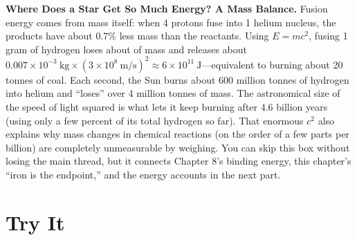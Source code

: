 \begin{tiaozhan}
\textbf{Where Does a Star Get So Much Energy? A Mass Balance.} Fusion energy comes from mass itself: when 4 protons fuse into 1 helium nucleus, the products have about $0.7\%$ less mass than the reactants. Using $E=mc^2$, fusing 1 gram of hydrogen loses about  of mass and releases about $0.007\times 10^{-3}\ \mathrm{kg}\times (3\times 10^{8}\ \mathrm{m/s})^2 \approx 6\times 10^{11}\ \mathrm{J}$---equivalent to burning about 20 tonnes of coal. Each second, the Sun burns about 600 million tonnes of hydrogen into helium and ``loses'' over 4 million tonnes of mass. The astronomical size of the speed of light squared is what lets it keep burning after 4.6 billion years (using only a few percent of its total hydrogen so far). That enormous $c^2$ also explains why mass changes in chemical reactions (on the order of a few parts per billion) are completely unmeasurable by weighing. You can skip this box without losing the main thread, but it connects Chapter 8's binding energy, this chapter's ``iron is the endpoint,'' and the energy accounts in the next part.
\end{tiaozhan}

\section*{Try It}

